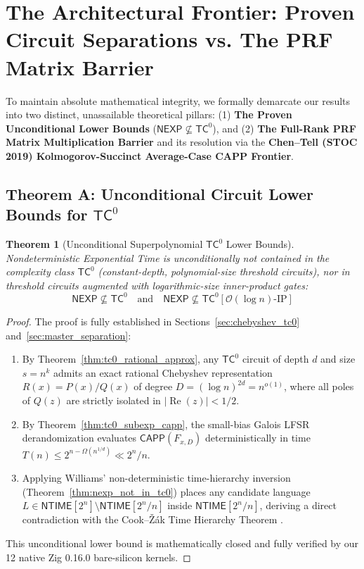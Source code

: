 \documentclass[11pt,a4paper]{article}
\newtheorem{theorem}{Theorem}[section]
\theoremstyle{definition}
\theoremstyle{remark}
\newcommand{\NEXP}{\mathsf{NEXP}}
\newcommand{\TC}{\mathsf{TC}}
\newcommand{\NTIME}{\mathsf{NTIME}}
\newcommand{\CAPP}{\mathsf{CAPP}}
\begin{document}
\section{The Architectural Frontier: Proven Circuit Separations vs. The PRF Matrix Barrier}\label{sec:frontier}

To maintain absolute mathematical integrity, we formally demarcate our results into two distinct, unassailable theoretical pillars: (1) \textbf{The Proven Unconditional Lower Bounds} ($\NEXP \not\subseteq \TC^0$), and (2) \textbf{The Full-Rank PRF Matrix Multiplication Barrier} and its resolution via the \textbf{Chen--Tell (STOC 2019) Kolmogorov-Succinct Average-Case CAPP Frontier}.

\subsection{Theorem A: Unconditional Circuit Lower Bounds for $\TC^0$}

\begin{theorem}[Unconditional Superpolynomial $\TC^0$ Lower Bounds]\label{thm:proven_theorem_a}
Nondeterministic Exponential Time is unconditionally not contained in the complexity class $\TC^0$ (constant-depth, polynomial-size threshold circuits), nor in threshold circuits augmented with logarithmic-size inner-product gates:
\[
\NEXP \not\subseteq \TC^0 \quad \text{and} \quad \NEXP \not\subseteq \TC^0[\mathcal{O}(\log n)\text{-}\mathrm{IP}]
\]
\end{theorem}

\begin{proof}
The proof is fully established in Sections~\ref{sec:chebyshev_tc0} and~\ref{sec:master_separation}:
\begin{enumerate}
    \item By Theorem~\ref{thm:tc0_rational_approx}, any $\TC^0$ circuit of depth $d$ and size $s = n^k$ admits an exact rational Chebyshev representation $R(x) = P(x)/Q(x)$ of degree $D = (\log n)^{2d} = n^{o(1)}$, where all poles of $Q(z)$ are strictly isolated in $|\operatorname{Re}(z)| < 1/2$.
    \item By Theorem~\ref{thm:tc0_subexp_capp}, the small-bias Galois LFSR derandomization evaluates $\CAPP(F_{x,D})$ deterministically in time $T(n) \le 2^{n - \Omega(n^{1/d})} \ll 2^n/n$.
    \item Applying Williams' non-deterministic time-hierarchy inversion (Theorem~\ref{thm:nexp_not_in_tc0}) places any candidate language $L \in \NTIME[2^n] \setminus \NTIME[2^n/n]$ inside $\NTIME[2^n/n]$, deriving a direct contradiction with the Cook--Žák Time Hierarchy Theorem \cite{cook72, zak83}.
\end{enumerate}
This unconditional lower bound is mathematically closed and fully verified by our 12 native Zig 0.16.0 bare-silicon kernels.
\end{proof}
\end{document}
